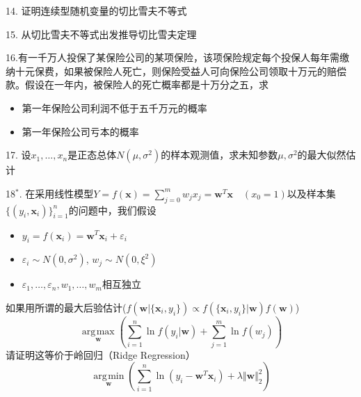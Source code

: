 \documentclass[10pt]{beamer}
\DeclareMathOperator*{\argmin}{\arg\!\min}
\DeclareMathOperator*{\argmax}{\arg\!\max}
\begin{document}

\begin{frame}

14. 证明连续型随机变量的切比雪夫不等式

\vspace{1em}

15. 从切比雪夫不等式出发推导切比雪夫定理

\vspace{1em}

16.有一千万人投保了某保险公司的某项保险，该项保险规定每个投保人每年需缴纳十元保费，如果被保险人死亡，则保险受益人可向保险公司领取十万元的赔偿款。假设在一年内，被保险人的死亡概率都是十万分之五，求
\vspace{0.4em}
\begin{itemize}
\item[(1)] 第一年保险公司利润不低于五千万元的概率
\vspace{0.4em}
\item[(2)] 第一年保险公司亏本的概率
\end{itemize}

\vspace{1em}

17. 设$x_1,\ldots,x_n$是正态总体$N(\mu,\sigma^2)$的样本观测值，求未知参数$\mu,\sigma^2$的最大似然估计

\end{frame}


\begin{frame}

18$^*$. 在采用线性模型$Y = f(\mathbf{x}) = \sum\limits_{j=0}^m w_jx_j  = \mathbf{w}^T\mathbf{x} \quad (x_0=1)$以及样本集$\{(y_i,\mathbf{x}_i)\}_{i=1}^n$的问题中，我们假设
\begin{itemize}
\item $y_i = f(\mathbf{x}_i) = \mathbf{w}^T \mathbf{x}_i + \varepsilon_i$
\item $\varepsilon_i \sim N(0, \sigma^2)$, $w_j \sim N(0, \xi^2)$
\item $\varepsilon_1, \ldots, \varepsilon_n, w_1, \ldots, w_m$相互独立
\end{itemize}
如果用所谓的最大后验估计($f(\mathbf{w} | \{\mathbf{x}_i,y_i\}) \propto f(\{\mathbf{x}_i,y_i\} | \mathbf{w}) f(\mathbf{w})$)
$$\argmax\limits_{\mathbf{w}} \left( \sum\limits_{i=1}^n \ln f(y_i|\mathbf{w}) + \sum\limits_{j=1}^m \ln f(w_j) \right)$$
请证明这等价于岭回归（Ridge Regression）
$$\argmin\limits_{\mathbf{w}} \left( \sum\limits_{i=1}^n \ln (y_i - \mathbf{w}^T\mathbf{x}_i) + \lambda \Vert \mathbf{w} \Vert_2^2 \right)$$
\end{frame}
\end{document}
